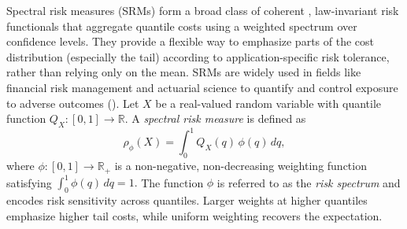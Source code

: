 Spectral risk measures (SRMs) \citep{acerbi2002spectral} form a broad class of coherent \citep{artzner1999coherent}, law-invariant risk
functionals that aggregate quantile costs using a weighted spectrum over
confidence levels. They provide a flexible way to emphasize parts of the cost distribution (especially the tail) according to application-specific risk tolerance, rather than relying only on the mean. SRMs are widely used in fields like financial risk management and actuarial science to quantify and control exposure to adverse outcomes (\citet{dowd2008spectral,adam2008spectral}). Let $X$ be a real-valued random variable with quantile function
$Q_X : [0,1] \to \mathbb{R}$. A \emph{spectral risk measure} is defined as
\begin{equation}
  \rho_\phi(X)
  =
  \int_0^1 Q_X(q)\,\phi(q)\,dq,
\end{equation}
where $\phi : [0,1] \to \mathbb{R}_+$ is a non-negative, non-decreasing
weighting function satisfying
$\int_0^1 \phi(q)\,dq = 1.$
The function $\phi$ is referred to as the \emph{risk spectrum} and encodes
risk sensitivity across quantiles. Larger weights at higher quantiles emphasize higher
tail costs, while uniform weighting recovers the expectation.


